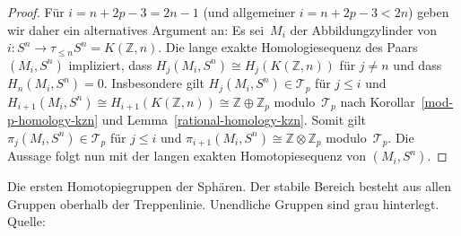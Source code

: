 \documentclass[11pt, a4paper, german]{article}
\theoremstyle{definition}
\theoremstyle{remark}
\newcommand{\Z}{\mathbb{Z}} %
\newcommand{\FG}{\mathcal{FG}} %
\newcommand{\T}{\mathcal{T}} %
\newcommand{\F}{\mathcal{F}} %
\begin{document}
\begin{proof}
  Für $i = n + 2p - 3 = 2n - 1$ (und allgemeiner $i = n + 2p - 3 < 2n$) geben wir daher ein alternatives Argument an:
  Es sei~$M_i$ der Abbildungzylinder von $i : S^n \to \tau_{\leq n} S^n = K(\Z, n)$.
  Die lange exakte Homologiesequenz des Paars $(M_i, S^n)$ impliziert, dass $H_j(M_i, S^n) \cong H_j(K(\Z, n))$ für $j \neq n$ und dass $H_n(M_i, S^n) = 0$.
  Insbesondere gilt $H_j(M_i, S^n) \in \T_p$ für $j \leq i$ und $H_{i+1}(M_i, S^n) \cong H_{i+1}(K(\Z, n)) \cong \Z \oplus \Z_p$ modulo~$\T_p$ nach Korollar~\ref{mod-p-homology-kzn} und Lemma~\ref{rational-homology-kzn}.
  Somit gilt $\pi_j(M_i, S^n) \in \T_p$ für $j \leq i$ und $\pi_{i+1}(M_i, S^n) \cong \Z \otimes \Z_p$ modulo~$\T_p$.
  Die Aussage folgt nun mit der langen exakten Homotopiesequenz von $(M_i, S^n)$.
\end{proof}

\nocite{*}
\printbibliography

\newpage
{}
\begin{landscape}
  \begin{center}
    \mbox{}\vspace{8em}
    \begin{table}
      \footnotesize \setlength\extrarowheight{5pt}
      
      \caption{Die ersten Homotopiegruppen der Sphären. Der stabile Bereich besteht aus allen Gruppen oberhalb der Treppenlinie. Unendliche Gruppen sind grau hinterlegt. Quelle: \cite{toda:composition}}
    \end{table}
  \end{center}
\end{landscape}

\end{document}
